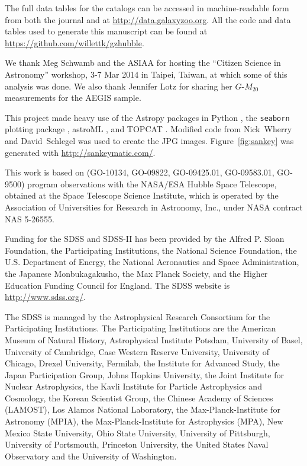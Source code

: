 \documentclass[twocolumn]{aastex6}
\begin{document}
The full data tables for the catalogs can be accessed in machine-readable form from both the journal and at \url{http://data.galaxyzoo.org}. All the code and data tables used to generate this manuscript can be found at \url{https://github.com/willettk/gzhubble}.
 
\acknowledgments

We thank Meg Schwamb and the ASIAA for hosting the ``Citizen Science in Astronomy'' workshop, 3-7 Mar 2014 in Taipei, Taiwan, at which some of this analysis was done. We also thank Jennifer Lotz for sharing her $G$-$M_{20}$ measurements for the AEGIS sample.

This project made heavy use of the Astropy packages in Python \citep{ast13}, the \texttt{seaborn} plotting package \citep{was15}, astroML \citep{van12}, and TOPCAT \citep{tay05,tay11}. Modified code from Nick~Wherry and David~Schlegel was used to create the JPG images. Figure~\ref{fig:sankey} was generated with \url{http://sankeymatic.com/}.

This work is based on (GO-10134, GO-09822, GO-09425.01, GO-09583.01, GO-9500) program observations with the NASA/ESA Hubble Space Telescope, obtained at the Space Telescope Science Institute, which is operated by the Association of Universities for Research in Astronomy, Inc., under NASA contract NAS 5-26555. 

Funding for the SDSS and SDSS-II has been provided by the Alfred P. Sloan Foundation, the Participating Institutions, the National Science Foundation, the U.S. Department of Energy, the National Aeronautics and Space Administration, the Japanese Monbukagakusho, the Max Planck Society, and the Higher Education Funding Council for England. The SDSS website is \url{http://www.sdss.org/}. 

The SDSS is managed by the Astrophysical Research Consortium for the Participating Institutions. The Participating Institutions are the American Museum of Natural History, Astrophysical Institute Potsdam, University of Basel, University of Cambridge, Case Western Reserve University, University of Chicago, Drexel University, Fermilab, the Institute for Advanced Study, the Japan Participation Group, Johns Hopkins University, the Joint Institute for Nuclear Astrophysics, the Kavli Institute for Particle Astrophysics and Cosmology, the Korean Scientist Group, the Chinese Academy of Sciences (LAMOST), Los Alamos National Laboratory, the Max-Planck-Institute for Astronomy (MPIA), the Max-Planck-Institute for Astrophysics (MPA), New Mexico State University, Ohio State University, University of Pittsburgh, University of Portsmouth, Princeton University, the United States Naval Observatory and the University of Washington. 
\end{document}
